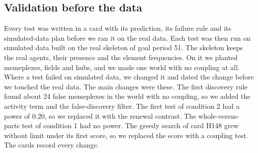 \subsection{Validation before the data}

Every test was written in a card with its prediction, its failure rule and its simulated-data plan before we ran it on the real data. Each test was then run on simulated data built on the real skeleton of goal period 51. The skeleton keeps the real agents, their presence and the element frequencies. On it we planted memeplexes, fields and hubs, and we made one world with no coupling at all. Where a test failed on simulated data, we changed it and dated the change before we touched the real data. The main changes were these. The first discovery rule found about 24 false memeplexes in the world with no coupling, so we added the activity term and the false-discovery filter. The first test of condition 2 had a power of 0.20, so we replaced it with the renewal contrast. The whole-versus-parts test of condition 1 had no power. The greedy search of card H148 grew without limit under its first score, so we replaced the score with a coupling test. The cards record every change.

